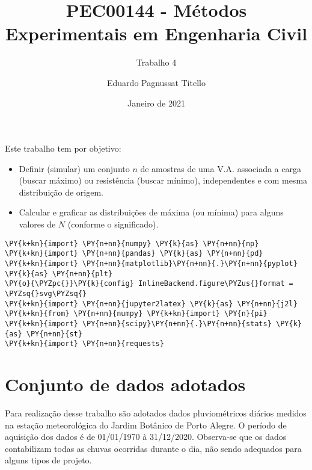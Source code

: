

\author{Eduardo Pagnussat Titello}
\title{PEC00144 - Métodos Experimentais em Engenharia Civil}
\subtitle{Trabalho 4}
\date{Janeiro de 2021}



	
	\maketitle

Este trabalho tem por objetivo:

\begin{itemize}
\item
  Definir (simular) um conjunto $n$ de amostras de uma V.A. associada a
  carga (buscar máximo) ou resistência (buscar mínimo), independentes e
  com mesma distribuição de origem.
\item
  Calcular e graficar as distribuições de máxima (ou mínima) para alguns
  valores de \(N\) (conforme o significado).
\end{itemize}

    \begin{tcolorbox}[breakable, size=fbox, boxrule=1pt, pad at break*=1mm,colback=cellbackground, colframe=cellborder]
\begin{Verbatim}[commandchars=\\\{\}]
\PY{k+kn}{import} \PY{n+nn}{numpy} \PY{k}{as} \PY{n+nn}{np}
\PY{k+kn}{import} \PY{n+nn}{pandas} \PY{k}{as} \PY{n+nn}{pd} 
\PY{k+kn}{import} \PY{n+nn}{matplotlib}\PY{n+nn}{.}\PY{n+nn}{pyplot} \PY{k}{as} \PY{n+nn}{plt}
\PY{o}{\PYZpc{}}\PY{k}{config} InlineBackend.figure\PYZus{}format = \PYZsq{}svg\PYZsq{}
\PY{k+kn}{import} \PY{n+nn}{jupyter2latex} \PY{k}{as} \PY{n+nn}{j2l}
\PY{k+kn}{from} \PY{n+nn}{numpy} \PY{k+kn}{import} \PY{n}{pi}
\PY{k+kn}{import} \PY{n+nn}{scipy}\PY{n+nn}{.}\PY{n+nn}{stats} \PY{k}{as} \PY{n+nn}{st}
\PY{k+kn}{import} \PY{n+nn}{requests}
\end{Verbatim}
\end{tcolorbox}

    \hypertarget{conjunto-de-dados-adotados}{%
\section{Conjunto de dados adotados}\label{conjunto-de-dados-adotados}}

Para realização desse trabalho são adotados dados pluviométricos diários
medidos na estação meteorológica do Jardim Botânico de Porto Alegre. O
período de aquisição dos dados é de 01/01/1970 à 31/12/2020. Observa-se
que os dados contabilizam todas as chuvas ocorridas durante o dia, não
sendo adequados para alguns tipos de projeto.

